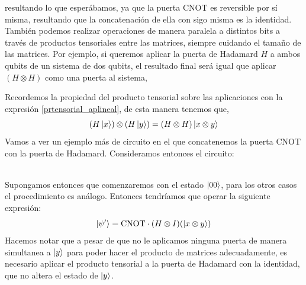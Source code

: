 \documentclass[a4paper]{article}
\numberwithin{equation}{section}
\begin{document}
resultando lo que esperábamos, ya que la puerta CNOT es reversible por sí misma, resultando que la concatenación de ella con sigo misma es la identidad.\\
\linebreak
También podemos realizar operaciones de manera paralela a distintos bits a través de productos tensoriales entre las matrices, siempre cuidando el tamaño de las matrices. Por ejemplo, si queremos aplicar la puerta de Hadamard $H$ a ambos qubits de un sistema de dos qubits, el resultado final será igual que aplicar $(H\otimes H)$ como una puerta al sistema,
\begin{figure}[h]
\centering
{}
\end{figure}
Recordemos la propiedad del producto tensorial sobre las aplicaciones con la expresión \ref{prtensorial_aplineal}, de esta manera tenemos que,
\begin{equation} \label{matriz_tensorial}
(H\ket{x})\otimes(H\ket{y}) = (H\otimes H)\ket{x\otimes y}
\end{equation}
Vamos a ver un ejemplo más de circuito en el que concatenemos la puerta CNOT con la puerta de Hadamard. Consideramos entonces el circuito:
\begin{figure}[h]
\centering
{}
\end{figure}\\
Supongamos entonces que comenzaremos con el estado $\ket{00}$, para los otros casos el procedimiento es análogo. Entonces tendríamos que operar la siguiente expresión:
\begin{equation}
\ket{\psi'} = \textrm{CNOT}\cdot(H\otimes I)(\ket{x\otimes y})
\end{equation}
Hacemos notar que a pesar de que no le aplicamos ninguna puerta de manera simultanea a $\ket{y}$ para poder hacer el producto de matrices adecuadamente, es necesario aplicar el producto tensorial a la puerta de Hadamard con la identidad, que no altera el estado de $\ket{y}$.\\
\end{document}
